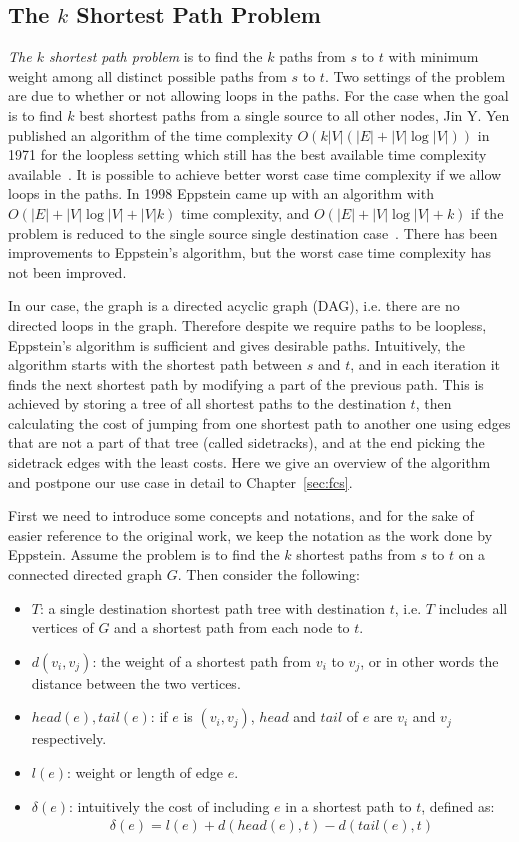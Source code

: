 \subsection{The $k$ Shortest Path Problem}
\emph{The $k$ shortest path problem} is to find the $k$ paths from $s$ to $t$ with minimum weight among all distinct possible paths from $s$ to $t$. Two settings of the problem are due to whether or not allowing loops in the paths. For the case when the goal is to find $k$ best shortest paths from a single source to all other nodes, Jin Y. Yen published an algorithm of the time complexity $O(k |V|(|E|+|V|\log|V|))$ in 1971 for the loopless setting which still has the best available time complexity available~\cite{yen1971finding}. It is possible to achieve better worst case time complexity if we allow loops in the paths. In 1998 Eppstein came up with an algorithm with $O(|E| + |V|\log|V| + |V| k)$ time complexity, and $O(|E| + |V|\log|V| + k)$ if the problem is reduced to the single source single destination case~\cite{eppstein1998finding}. There has been improvements to Eppstein's algorithm, but the worst case time complexity has not been improved.

In our case, the graph is a directed acyclic graph (DAG), i.e. there are no directed loops in the graph. Therefore despite we require paths to be loopless, Eppstein's algorithm is sufficient and gives desirable paths.
Intuitively, the algorithm starts with the shortest path between $s$ and $t$, and in each iteration it finds the next shortest path by modifying a part of the previous path. This is achieved by storing a tree of all shortest paths to the destination $t$, then calculating the cost of jumping from one shortest path to another one using edges that are not a part of that tree (called sidetracks), and at the end picking the sidetrack edges with the least costs.
Here we give an overview of the algorithm and postpone our use case in detail to Chapter~\ref{sec:fcs}.

First we need to introduce some concepts and notations, and for the sake of easier reference to the original work, we keep the notation as the work done by Eppstein.
Assume the problem is to find the $k$ shortest paths from $s$ to $t$ on a connected directed graph $G$. Then consider the following:
\begin{itemize}
\item $T$: a single destination shortest path tree with destination $t$, i.e. $T$ includes all vertices of $G$ and a shortest path from each node to $t$.
\item $d(v_i, v_j)$: the weight of a shortest path from $v_i$ to $v_j$, or in other words the distance between the two vertices.
\item $head(e), tail(e)$: if $e$ is $(v_i, v_j)$, $head$ and $tail$ of $e$ are $v_i$ and $v_j$ respectively.
\item $l(e)$: weight or length of edge $e$.
\item $\delta(e)$: intuitively the cost of including $e$ in a shortest path to $t$, defined as:
  \begin{align}
    \delta(e) = l(e) + d(head(e), t) - d(tail(e), t)
  \end{align}
\end{itemize}

